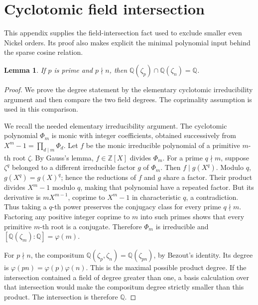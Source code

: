 \documentclass[11pt]{article}
\numberwithin{equation}{section}
\newtheorem{lemma}[theorem]{Lemma}
\theoremstyle{definition}
\newcommand{\Q}{\mathbb Q}
\newcommand{\Z}{\mathbb Z}
\begin{document}

\appendix

\section{Cyclotomic field intersection}

This appendix supplies the field-intersection fact used to exclude
smaller even Nickel orders. Its proof also makes explicit the minimal
polynomial input behind the sparse cosine relation.
\begin{lemma}\label{lem:cyclotomic}
If \(p\) is prime and \(p\nmid n\), then
\(\Q(\zeta_p)\cap\Q(\zeta_n)=\Q\).
\end{lemma}
\begin{proof}
We prove the degree statement by the elementary cyclotomic irreducibility argument and then compare the two field degrees. The coprimality assumption is used in this comparison.

We recall the needed elementary irreducibility argument.
The cyclotomic polynomial \(\Phi_m\) is monic with integer
coefficients, obtained successively from \(X^m-1=\prod_{d\mid m}\Phi_d\).
Let \(f\) be the monic irreducible polynomial of a primitive \(m\)-th
root \(\zeta\). By Gauss's lemma, \(f\in\Z[X]\) divides \(\Phi_m\).
For a prime \(q\nmid m\), suppose \(\zeta^q\) belonged to a different
irreducible factor \(g\) of \(\Phi_m\). Then \(f\mid g(X^q)\).
Modulo \(q\), \(g(X^q)=g(X)^q\); hence the reductions of \(f\)
and \(g\) share a factor. Their product divides \(X^m-1\) modulo
\(q\), making that polynomial have a repeated factor.
But its derivative is \(mX^{m-1}\), coprime to \(X^m-1\)
in characteristic \(q\), a contradiction.
Thus taking a \(q\)-th power preserves the conjugacy class for
every prime \(q\nmid m\). Factoring any positive integer coprime
to \(m\) into such primes shows that every primitive \(m\)-th
root is a conjugate. Therefore \(\Phi_m\) is irreducible and
\([\Q(\zeta_m):\Q]=\varphi(m)\).

For \(p\nmid n\), the compositum
\(\Q(\zeta_p,\zeta_n)=\Q(\zeta_{pn})\), by Bezout's identity.
Its degree is
\(\varphi(pn)=\varphi(p)\varphi(n)\).
This is the maximal possible product degree. If the intersection
contained a field of degree greater than one, a basis calculation
over that intersection would make the compositum degree strictly
smaller than this product. The intersection is therefore \(\Q\).
\end{proof}
\end{document}
